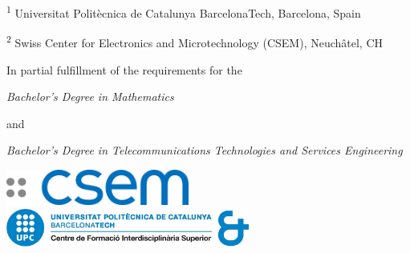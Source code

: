 \begin{center}
    \vspace{1cm}
    \footnotesize
    \textsuperscript{1} Universitat Polit\`ecnica de Catalunya BarcelonaTech, Barcelona, Spain

    \textsuperscript{2} Swiss Center for Electronics and Microtechnology (CSEM), Neuch\^atel, CH

    \vspace{1cm}
    \normalsize
    In partial fulfillment of the requirements for the

    \textit{Bachelor's Degree in Mathematics}

    and

    \textit{Bachelor's Degree in Telecommunications Technologies and Services Engineering}

    \vfill
    \includegraphics[width=6cm]{img/logo-csem.png} 
    \hfill
    \includegraphics[width=8cm]{img/cfis-upc-no-bg.png}

\end{center}

